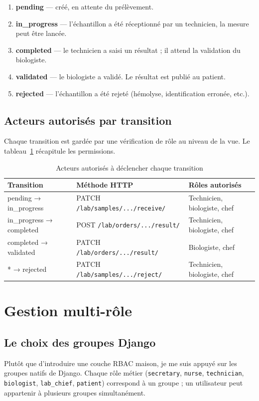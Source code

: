 \documentclass[12pt, a4paper, oneside]{report}
\begin{document}
\begin{enumerate}
  \item \textbf{pending} — créé, en attente du prélèvement.
  \item \textbf{in\_progress} — l'échantillon a été réceptionné par
        un technicien, la mesure peut être lancée.
  \item \textbf{completed} — le technicien a saisi un résultat ; il
        attend la validation du biologiste.
  \item \textbf{validated} — le biologiste a validé. Le résultat est
        publié au patient.
  \item \textbf{rejected} — l'échantillon a été rejeté (hémolyse,
        identification erronée, etc.).
\end{enumerate}

\subsection{Acteurs autorisés par transition}
Chaque transition est gardée par une vérification de rôle au niveau
de la vue. Le tableau~\ref{tab:transitions} récapitule les
permissions.

\begin{table}[ht]
  \centering
  \caption{Acteurs autorisés à déclencher chaque transition}
  \label{tab:transitions}
  \begin{tabularx}{\linewidth}{l l X}
    \toprule
    \textbf{Transition} & \textbf{Méthode HTTP} & \textbf{Rôles autorisés} \\
    \midrule
    pending → in\_progress       & PATCH \texttt{/lab/samples/.../receive/} & Technicien, biologiste, chef \\
    in\_progress → completed     & POST \texttt{/lab/orders/.../result/}    & Technicien, biologiste, chef \\
    completed → validated        & PATCH \texttt{/lab/orders/.../result/}   & Biologiste, chef \\
    * → rejected                 & PATCH \texttt{/lab/samples/.../reject/}  & Technicien, biologiste, chef \\
    \bottomrule
  \end{tabularx}
\end{table}

\section{Gestion multi-rôle}

\subsection{Le choix des groupes Django}
Plutôt que d'introduire une couche RBAC maison, je me suis appuyé sur
les groupes natifs de Django. Chaque rôle métier (\texttt{secretary},
\texttt{nurse}, \texttt{technician}, \texttt{biologist},
\texttt{lab\_chief}, \texttt{patient}) correspond à un groupe ; un
utilisateur peut appartenir à plusieurs groupes simultanément.
\end{document}
